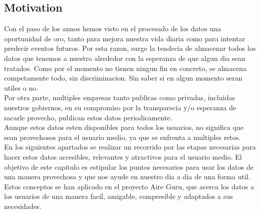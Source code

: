 \subsection*{Motivation}
Con el paso de los annos hemos visto en el procesado de los datos una oportunidad de oro, 
tanto para mejora nuestra vida diaria como para intentar predecir
eventos futuros. Por esta razon, surge la tendecia de almacenar todos los datos que tenemos 
a nuestro alrededor con la esperanza de que algun dia sean tratados.
Como por el momento no tienen ningun fin en concreto, se almacena competamente todo, sin discriminacion.
Sin saber si en algun momento seran utiles o no.\\

Por otra parte, multiples empresas tanto publicas como privadas, incluidas nuestros gobiernos, 
en su compromiso por la transparecia y/o esperanza de sacarle provecho, publican estos datos 
periodicamente.\\

Aunque estos datos esten disponibles para todos los usuarios, no significa que sean provechosos para el 
usuario medio, ya que se enfrenta a multiples retos.\\

En los siguientes apartados se realizar un recorrido por las etapas necesarias para hacer estos datos
accesibles, relevantes y atractivos para el usuario medio.
El objetivo de este capitulo es estipular los puntos necesarios para usar los datos de una manera provechosa y
que nos ayude en nuestro dia a dia de una forma util. Estos conceptos se han aplicado en el proyecto Aire Guru, que acerca los datos a los usuarios de una manera
facil, amigable, compresible y adaptados a sus necesidades.


